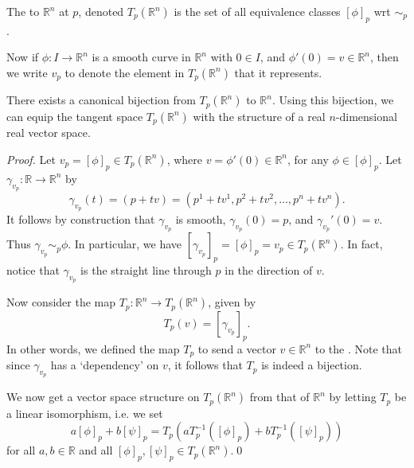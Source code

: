 \documentclass[notoc,notitlepage]{tufte-book}
\begin{document}
\begin{defn}\label{defn:tangent_space}
  The  to $\mathbb{R}^n$ at $p$, denoted
  $T_p \left(\mathbb{R}^n\right)$ is the set of all equivalence classes $[\phi]_p$
  wrt $\sim_p$.
\end{defn}

Now if $\phi : I \to \mathbb{R}^n$ is a smooth curve in $\mathbb{R}^n$ with $0 \in I$,
and $\phi'(0) = v \in \mathbb{R}^n$, then we write $v_p$ to denote the element in
$T_p \left( \mathbb{R}^n \right)$ that it represents.

\begin{propo}\label{propo:canonical_bijection_from_t_p_r_n_to_r_n_}
  There exists a canonical bijection from $T_p(\mathbb{R}^n)$ to $\mathbb{R}^n$.
  Using this bijection, we can equip the tangent space $T_p(\mathbb{R}^n)$ with the
  structure of a real $n$-dimensional real vector space.
\end{propo}

\begin{proof}
  Let $v_p = [\phi]_p \in T_p(\mathbb{R}^n)$, where $v = \phi'(0) \in \mathbb{R}^n$,
  for any $\phi \in [\phi]_p$. Let $\gamma_{v_p} : \mathbb{R} \to \mathbb{R}^n$ by
  \begin{equation*}
    \gamma_{v_p} (t) = (p + tv) = (p^1 + tv^1, p^2 + tv^2, \ldots, p^n + tv^n).
  \end{equation*}
  It follows by construction that $\gamma_{v_p}$ is smooth, $\gamma_{v_p}(0) = p$,
  and $\gamma_{v_p}'(0) = v$. Thus $\gamma_{v_p} \sim_p \phi$. In particular, we have
  $[\gamma_{v_p}]_p = [\phi]_p = v_p \in T_p (\mathbb{R}^n)$. In fact, notice that
  $\gamma_{v_p}$ is the straight line through $p$ in the direction of $v$.

  Now consider the map $T_p : \mathbb{R}^n \to T_p (\mathbb{R}^n)$, given by
  \begin{equation*}
    T_p(v) = [\gamma_{v_p}]_p.
  \end{equation*}
  In other words, we defined the map $T_p$ to send a vector $v \in \mathbb{R}^n$ to
  the . Note that since $\gamma_{v_p}$ has a `dependency' on $v$,
  it follows that $T_p$ is indeed a bijection.

  We now get a vector space structure on $T_p (\mathbb{R}^n)$ from that of $\mathbb{R}^n$
  by letting $T_p$ be a linear isomorphism, i.e. we set
  \begin{equation*}
    a[\phi]_p + b[\psi]_p = T_p \left( a T_p^{-1} ([\phi]_p) + bT_p^{-1} ([\psi]_p) \right)
  \end{equation*}
  for all $a, b \in \mathbb{R}$ and all $[\phi]_p, [\psi]_p \in T_p(\mathbb{R}^n)$.\qed
\end{proof}
\end{document}
